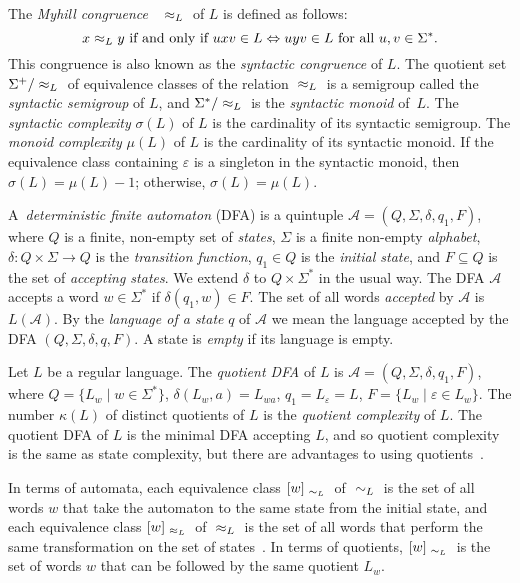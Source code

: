 \documentclass{llncs}
\newcommand{\eps}{\varepsilon}
\newcommand{\Sig}{\Sigma}
\newcommand{\sig}{\sigma}
\newcommand{\cA}{{\mathcal A}}
\newcommand{\raL}{{\hspace{.1cm}{\sim_L} \hspace{.1cm}}}
\newcommand{\lraL}{{\hspace{.1cm}{\approx_L} \hspace{.1cm}}}
\begin{document}
The \emph{Myhill congruence}~\cite{Myh57} $\lraL$ of $L$ is defined as follows:
\begin{equation*}
x \lraL y \mbox{ if and only if } uxv\in L  \Leftrightarrow uyv\in L\mbox { for all } u,v\in\Sig^*.
\end{equation*}
This congruence is also known as the \emph{syntactic congruence} of $L$.
The quotient set $\Sig^+/ \lraL$ of equivalence classes of the relation $\lraL$ is a semigroup called the \emph{syntactic semigroup} of $L$, and 
$\Sig^*/ \lraL$ is the \emph{syntactic monoid} of~$L$. 
The \emph{syntactic complexity} $\sig(L)$ of $L$ is the cardinality of its syntactic semigroup.
The \emph{monoid complexity} $\mu(L)$ of $L$ is the cardinality of its syntactic monoid.
If the  equivalence class containing $\eps$ is a singleton in the syntactic monoid, then $\sig(L)=\mu(L)-1$; otherwise, $\sig(L)=\mu(L)$.

A~\emph{deterministic finite automaton} (DFA) is a quintuple $\cA=(Q, \Sig, \delta, q_1,F)$, where 
$Q$ is a finite, non-empty set of \emph{states}, $\Sig$ is a finite non-empty \emph{alphabet}, $\delta:Q\times \Sig\to Q$ is the \emph{transition function}, $q_1\in Q$ is the \emph{initial state}, and $F\subseteq Q$ is the set of \emph{accepting states}. We extend $\delta$ to $Q \times \Sig^*$ in the usual way.
The DFA $\cA$ accepts a word $w \in \Sigma^*$ if ${\delta}(q_1,w)\in F$. 
The set of all words {\it accepted} by $\cA$ is $L(\cA)$. 
By the \emph{language of a state} $q$ of $\cA$ 
we mean the language accepted 
by the DFA $(Q,\Sigma,\delta,q,F)$. 
A state is \emph{empty} if its language is empty.

Let $L$ be a regular language. 
The \emph{quotient DFA} of $L$ is 
$\cA=(Q, \Sig, \delta, q_1,F)$, where $Q=\{L_w\mid w\in\Sig^*\}$, $\delta(L_w,a)=L_{wa}$, 
$q_1=L_\eps=L$,  $F=\{L_w \mid \eps \in L_w\}$.
The number  $\kappa(L)$ of distinct quotients of $L$ is the \emph{quotient complexity} of $L$. 
The quotient DFA of $L$ is the minimal DFA accepting $L$, and so quotient complexity is the same as  state complexity, but there are advantages to using quotients~\cite{Brz09}.


In terms of automata, each equivalence class $[w]_{\raL}$ of $\raL$ is the set of all words $w$ that take the automaton to the same state from the initial state, and each equivalence class $[w]_\lraL$ of $\lraL$ is the set of all words that perform the same transformation on the set of states~\cite{McNP71}.
In terms of quotients, $[w]_{\raL}$ is the set of words $w$ that can be followed by the same quotient $L_w$. 
\end{document}
